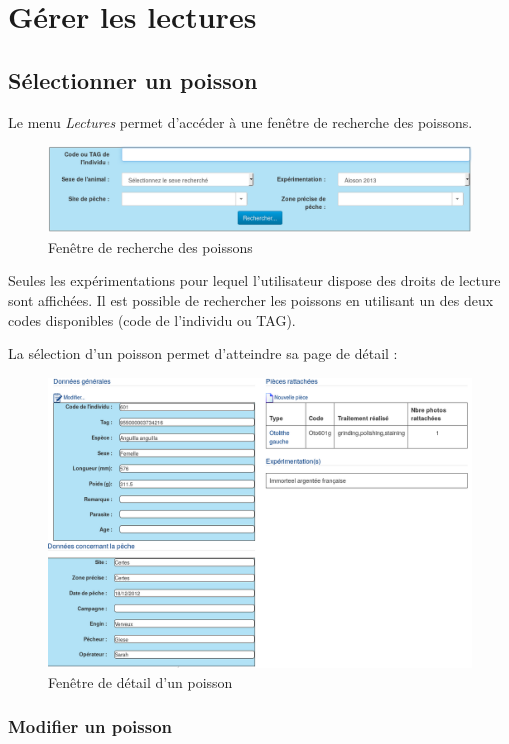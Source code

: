 \chapter{Gérer les lectures}
\section{Sélectionner un poisson}
Le menu \textit{Lectures} permet d'accéder à une fenêtre de recherche des poissons. 

\begin{figure}[H]
\centering
\includegraphics[width=\linewidth]{images/recherchePoisson}
\caption{Fenêtre de recherche des poissons}
\end{figure}

Seules les expérimentations pour lequel l'utilisateur dispose des droits de lecture sont affichées. Il est possible de rechercher les poissons en utilisant un des deux codes disponibles (code de l'individu ou TAG).

La sélection d'un poisson permet d'atteindre sa page de détail :
\begin{figure}[H]
\centering
\includegraphics[width=\linewidth]{images/poissonDetail}
\caption{Fenêtre de détail d'un poisson}
\end{figure}

\subsection{Modifier un poisson}

